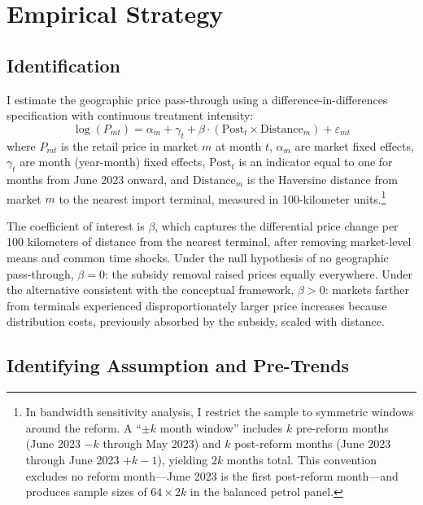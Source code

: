 \documentclass[12pt]{article}
\begin{document}



\section{Empirical Strategy}
\label{sec:strategy}

\subsection{Identification}

I estimate the geographic price pass-through using a difference-in-differences specification with continuous treatment intensity:
\begin{equation}
    \log(P_{mt}) = \alpha_m + \gamma_t + \beta \cdot (\text{Post}_t \times \text{Distance}_m) + \varepsilon_{mt}
    \label{eq:main}
\end{equation}
where $P_{mt}$ is the retail price in market $m$ at month $t$, $\alpha_m$ are market fixed effects, $\gamma_t$ are month (year-month) fixed effects, $\text{Post}_t$ is an indicator equal to one for months from June 2023 onward, and $\text{Distance}_m$ is the Haversine distance from market $m$ to the nearest import terminal, measured in 100-kilometer units.\footnote{In bandwidth sensitivity analysis, I restrict the sample to symmetric windows around the reform. A ``$\pm k$ month window'' includes $k$ pre-reform months (June 2023 $- k$ through May 2023) and $k$ post-reform months (June 2023 through June 2023 $+ k - 1$), yielding $2k$ months total. This convention excludes no reform month---June 2023 is the first post-reform month---and produces sample sizes of $64 \times 2k$ in the balanced petrol panel.}

The coefficient of interest is $\beta$, which captures the differential price change per 100 kilometers of distance from the nearest terminal, after removing market-level means and common time shocks. Under the null hypothesis of no geographic pass-through, $\beta = 0$: the subsidy removal raised prices equally everywhere. Under the alternative consistent with the conceptual framework, $\beta > 0$: markets farther from terminals experienced disproportionately larger price increases because distribution costs, previously absorbed by the subsidy, scaled with distance.

\subsection{Identifying Assumption and Pre-Trends}
\end{document}
